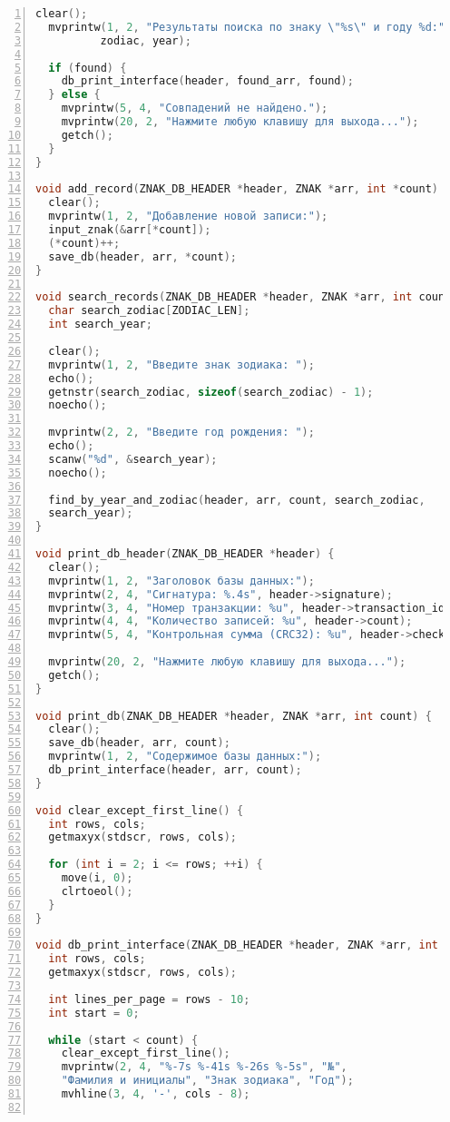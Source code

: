 \begin{lstlisting}[language=C,numbers=left]
  clear();
  mvprintw(1, 2, "Результаты поиска по знаку \"%s\" и году %d:",
          zodiac, year);

  if (found) {
    db_print_interface(header, found_arr, found);
  } else {
    mvprintw(5, 4, "Совпадений не найдено.");
    mvprintw(20, 2, "Нажмите любую клавишу для выхода...");
    getch();
  }
}

void add_record(ZNAK_DB_HEADER *header, ZNAK *arr, int *count) {
  clear();
  mvprintw(1, 2, "Добавление новой записи:");
  input_znak(&arr[*count]);
  (*count)++;
  save_db(header, arr, *count);
}

void search_records(ZNAK_DB_HEADER *header, ZNAK *arr, int count) {
  char search_zodiac[ZODIAC_LEN];
  int search_year;

  clear();
  mvprintw(1, 2, "Введите знак зодиака: ");
  echo();
  getnstr(search_zodiac, sizeof(search_zodiac) - 1);
  noecho();

  mvprintw(2, 2, "Введите год рождения: ");
  echo();
  scanw("%d", &search_year);
  noecho();

  find_by_year_and_zodiac(header, arr, count, search_zodiac,
  search_year);
}

void print_db_header(ZNAK_DB_HEADER *header) {
  clear();
  mvprintw(1, 2, "Заголовок базы данных:");
  mvprintw(2, 4, "Сигнатура: %.4s", header->signature);
  mvprintw(3, 4, "Номер транзакции: %u", header->transaction_id);
  mvprintw(4, 4, "Количество записей: %u", header->count);
  mvprintw(5, 4, "Контрольная сумма (CRC32): %u", header->checksum);

  mvprintw(20, 2, "Нажмите любую клавишу для выхода...");
  getch();
}

void print_db(ZNAK_DB_HEADER *header, ZNAK *arr, int count) {
  clear();
  save_db(header, arr, count);
  mvprintw(1, 2, "Содержимое базы данных:");
  db_print_interface(header, arr, count);
}

void clear_except_first_line() {
  int rows, cols;
  getmaxyx(stdscr, rows, cols);

  for (int i = 2; i <= rows; ++i) {
    move(i, 0);
    clrtoeol();
  }
}

void db_print_interface(ZNAK_DB_HEADER *header, ZNAK *arr, int count) {
  int rows, cols;
  getmaxyx(stdscr, rows, cols);
  
  int lines_per_page = rows - 10;
  int start = 0;
  
  while (start < count) {
    clear_except_first_line();
    mvprintw(2, 4, "%-7s %-41s %-26s %-5s", "№", 
    "Фамилия и инициалы", "Знак зодиака", "Год");
    mvhline(3, 4, '-', cols - 8);


\end{lstlisting}
